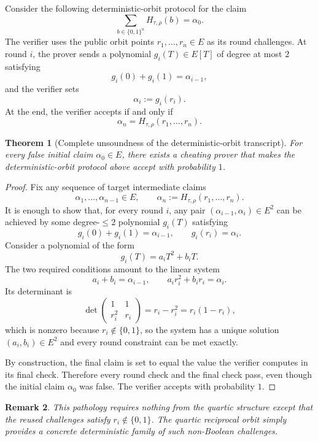 \documentclass[11pt]{article}
\newtheorem{theorem}{Theorem}[section]
\newtheorem{remark}[theorem]{Remark}
\begin{document}
Consider the following deterministic-orbit protocol for the claim
\[
\sum_{b\in\{0,1\}^n} H_{\tau,\rho}(b)=\alpha_0.
\]
The verifier uses the public orbit points $r_1,\dots,r_n\in E$ as its round challenges. At round $i$, the prover sends a polynomial $g_i(T)\in E[T]$ of degree at most $2$ satisfying
\[
g_i(0)+g_i(1)=\alpha_{i-1},
\]
and the verifier sets
\[
\alpha_i:=g_i(r_i).
\]
At the end, the verifier accepts if and only if
\[
\alpha_n=H_{\tau,\rho}(r_1,\dots,r_n).
\]

\begin{theorem}[Complete unsoundness of the deterministic-orbit transcript]
\label{thm:it-deterministic-unsound}
For every false initial claim $\alpha_0\in E$, there exists a cheating prover that makes the deterministic-orbit protocol above accept with probability $1$.
\end{theorem}

\begin{proof}
Fix any sequence of target intermediate claims
\[
\alpha_1,\dots,\alpha_{n-1}\in E,
\qquad
\alpha_n:=H_{\tau,\rho}(r_1,\dots,r_n).
\]
It is enough to show that, for every round $i$, any pair $(\alpha_{i-1},\alpha_i)\in E^2$ can be achieved by some degree-$\le 2$ polynomial $g_i(T)$ satisfying
\[
g_i(0)+g_i(1)=\alpha_{i-1},
\qquad
g_i(r_i)=\alpha_i.
\]
Consider a polynomial of the form
\[
g_i(T)=a_iT^2+b_iT.
\]
The two required conditions amount to the linear system
\[
a_i+b_i=\alpha_{i-1},
\qquad
a_i r_i^2+b_i r_i=\alpha_i.
\]
Its determinant is
\[
\det\begin{pmatrix}1&1\\ r_i^2&r_i\end{pmatrix}=r_i-r_i^2=r_i(1-r_i),
\]
which is nonzero because $r_i\notin\{0,1\}$, so the system has a unique solution $(a_i,b_i)\in E^2$ and every round constraint can be met exactly.

By construction, the final claim is set to equal the value the verifier computes in its final check. Therefore every round check and the final check pass, even though the initial claim $\alpha_0$ was false. The verifier accepts with probability $1$.
\end{proof}

\begin{remark}
This pathology requires nothing from the quartic structure except that the reused challenges satisfy $r_i\notin\{0,1\}$. The quartic reciprocal orbit simply provides a concrete deterministic family of such non-Boolean challenges.
\end{remark}
\end{document}
